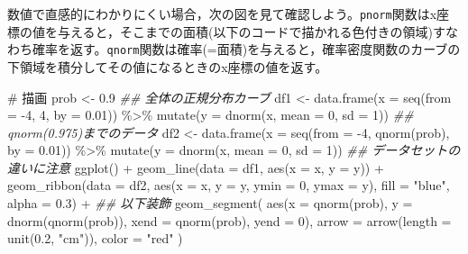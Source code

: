 \documentclass[
  a4paper,
]{ltjsbook}
\newenvironment{Shaded}{\begin{snugshade}}{\end{snugshade}}
\newcommand{\AttributeTok}[1]{\textcolor[rgb]{0.40,0.45,0.13}{#1}}
\newcommand{\CommentTok}[1]{\textcolor[rgb]{0.37,0.37,0.37}{#1}}
\newcommand{\DecValTok}[1]{\textcolor[rgb]{0.68,0.00,0.00}{#1}}
\newcommand{\DocumentationTok}[1]{\textcolor[rgb]{0.37,0.37,0.37}{\textit{#1}}}
\newcommand{\FloatTok}[1]{\textcolor[rgb]{0.68,0.00,0.00}{#1}}
\newcommand{\FunctionTok}[1]{\textcolor[rgb]{0.28,0.35,0.67}{#1}}
\newcommand{\NormalTok}[1]{\textcolor[rgb]{0.00,0.23,0.31}{#1}}
\newcommand{\OtherTok}[1]{\textcolor[rgb]{0.00,0.23,0.31}{#1}}
\newcommand{\SpecialCharTok}[1]{\textcolor[rgb]{0.37,0.37,0.37}{#1}}
\newcommand{\StringTok}[1]{\textcolor[rgb]{0.13,0.47,0.30}{#1}}
\begin{document}
数値で直感的にわかりにくい場合，次の図を見て確認しよう。\texttt{pnorm}関数はx座標の値を与えると，そこまでの面積(以下のコードで描かれる色付きの領域)すなわち確率を返す。\texttt{qnorm}関数は確率(=面積)を与えると，確率密度関数のカーブの下領域を積分してその値になるときのx座標の値を返す。

\begin{Shaded}
\begin{Highlighting}[]
\CommentTok{\# 描画}
\NormalTok{prob }\OtherTok{\textless{}{-}} \FloatTok{0.9}
\DocumentationTok{\#\# 全体の正規分布カーブ}
\NormalTok{df1 }\OtherTok{\textless{}{-}} \FunctionTok{data.frame}\NormalTok{(}\AttributeTok{x =} \FunctionTok{seq}\NormalTok{(}\AttributeTok{from =} \SpecialCharTok{{-}}\DecValTok{4}\NormalTok{, }\DecValTok{4}\NormalTok{, }\AttributeTok{by =} \FloatTok{0.01}\NormalTok{)) }\SpecialCharTok{\%\textgreater{}\%}
  \FunctionTok{mutate}\NormalTok{(}\AttributeTok{y =} \FunctionTok{dnorm}\NormalTok{(x, }\AttributeTok{mean =} \DecValTok{0}\NormalTok{, }\AttributeTok{sd =} \DecValTok{1}\NormalTok{))}
\DocumentationTok{\#\# qnorm(0.975)までのデータ}
\NormalTok{df2 }\OtherTok{\textless{}{-}} \FunctionTok{data.frame}\NormalTok{(}\AttributeTok{x =} \FunctionTok{seq}\NormalTok{(}\AttributeTok{from =} \SpecialCharTok{{-}}\DecValTok{4}\NormalTok{, }\FunctionTok{qnorm}\NormalTok{(prob), }\AttributeTok{by =} \FloatTok{0.01}\NormalTok{)) }\SpecialCharTok{\%\textgreater{}\%}
  \FunctionTok{mutate}\NormalTok{(}\AttributeTok{y =} \FunctionTok{dnorm}\NormalTok{(x, }\AttributeTok{mean =} \DecValTok{0}\NormalTok{, }\AttributeTok{sd =} \DecValTok{1}\NormalTok{))}
\DocumentationTok{\#\# データセットの違いに注意}
\FunctionTok{ggplot}\NormalTok{() }\SpecialCharTok{+}
  \FunctionTok{geom\_line}\NormalTok{(}\AttributeTok{data =}\NormalTok{ df1, }\FunctionTok{aes}\NormalTok{(}\AttributeTok{x =}\NormalTok{ x, }\AttributeTok{y =}\NormalTok{ y)) }\SpecialCharTok{+}
  \FunctionTok{geom\_ribbon}\NormalTok{(}\AttributeTok{data =}\NormalTok{ df2, }\FunctionTok{aes}\NormalTok{(}\AttributeTok{x =}\NormalTok{ x, }\AttributeTok{y =}\NormalTok{ y, }\AttributeTok{ymin =} \DecValTok{0}\NormalTok{, }\AttributeTok{ymax =}\NormalTok{ y), }\AttributeTok{fill =} \StringTok{"blue"}\NormalTok{, }\AttributeTok{alpha =} \FloatTok{0.3}\NormalTok{) }\SpecialCharTok{+}
  \DocumentationTok{\#\# 以下装飾}
  \FunctionTok{geom\_segment}\NormalTok{(}
    \FunctionTok{aes}\NormalTok{(}\AttributeTok{x =} \FunctionTok{qnorm}\NormalTok{(prob), }\AttributeTok{y =} \FunctionTok{dnorm}\NormalTok{(}\FunctionTok{qnorm}\NormalTok{(prob)), }\AttributeTok{xend =} \FunctionTok{qnorm}\NormalTok{(prob), }\AttributeTok{yend =} \DecValTok{0}\NormalTok{),}
    \AttributeTok{arrow =} \FunctionTok{arrow}\NormalTok{(}\AttributeTok{length =} \FunctionTok{unit}\NormalTok{(}\FloatTok{0.2}\NormalTok{, }\StringTok{"cm"}\NormalTok{)), }\AttributeTok{color =} \StringTok{"red"}
\NormalTok{  )}
\end{Highlighting}
\end{Shaded}
\end{document}
